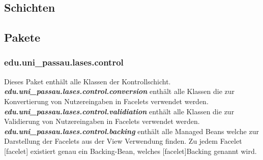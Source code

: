 
\subsection{Schichten}\label{arch:schichten}

\subsection{Pakete}\label{arch:pakete}

\subsubsection{edu.uni\_passau.lases.control}
Dieses Paket enthält alle Klassen der Kontrollschicht.
\newline\newline
\textbf{\emph{edu.uni\_passau.lases.control.conversion}}
enthält alle Klassen die zur Konvertierung von Nutzereingaben
in Facelets verwendet werden.
\newline\newline
\textbf{\emph{edu.uni\_passau.lases.control.validiation}}
enthält alle Klassen die zur Validierung von Nutzereingaben
in Facelets verwendet werden.
\newline\newline
\textbf{\emph{edu.uni\_passau.lases.control.backing}}\label{arch:backing}
enthält alle Managed Beans welche zur Darstellung der Facelets aus der
View Verwendung finden. Zu jedem Facelet [facelet] existiert genau ein
Backing-Bean, welches [facelet]Backing genannt wird.

